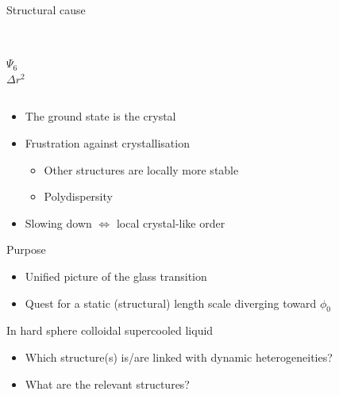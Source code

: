 \begin{frame}{Structural cause}
	\begin{footnotesize}\citet{tanaka2010critical}\end{footnotesize}
	\begin{columns}
	\centering
	\resizebox{\columnwidth}{!}{}\\
	$\Psi_6$
	\centering
	\resizebox{\columnwidth}{!}{}\\
	$\Delta r^2$
	\end{columns}
	\begin{itemize}
		\item The ground state is the crystal
		\item Frustration \alert{against} crystallisation
		\begin{itemize}
			\item Other structures are locally more stable
			\item Polydispersity
		\end{itemize}
		\item Slowing down $\Leftrightarrow$ local crystal-like order
	\end{itemize}
\end{frame}

\begin{frame}{Purpose}
	\begin{itemize}
		\item Unified picture of the glass transition
		\item Quest for a static (structural) length scale diverging toward $\phi_0$
	\end{itemize}
	
	\bigskip In hard sphere colloidal supercooled liquid
	\begin{itemize}
		\item Which structure(s) is/are linked with dynamic heterogeneities?
		\item What are the relevant structures?
	\end{itemize}
\end{frame}
